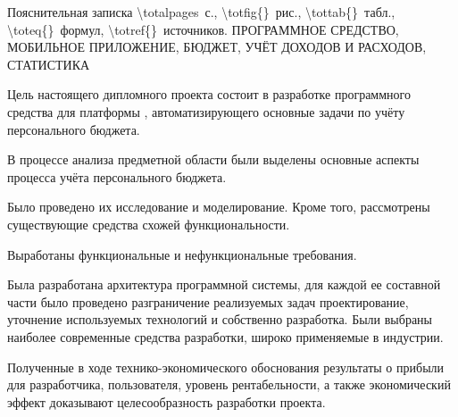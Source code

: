 \thispagestyle{empty}


\begin{center}
	Пояснительная записка \num{\totalpages}~с., 
	\num{\totfig{}}~рис., 
	\num{\tottab{}}~табл., 
	\num{\toteq{}}~формул, 
	\num{\totref{}}~источников.
	\MakeUppercase{Программное средство, мобильное приложение, бюджет, учёт доходов и расходов, статистика}
\end{center}

Цель настоящего дипломного проекта состоит в  разработке программного средства для платформы \andro, автоматизирующего основные задачи по учёту персонального бюджета.

В процессе анализа предметной области были выделены основные аспекты процесса учёта персонального бюджета.

Было проведено их исследование и моделирование.
Кроме того, рассмотрены существующие средства схожей функциональности.

Выработаны функциональные и нефункциональные требования.

Была разработана архитектура программной системы, для каждой ее составной части было проведено разграничение реализуемых задач проектирование, уточнение используемых технологий и собственно разработка.
Были выбраны наиболее современные средства разработки, широко применяемые в индустрии.

Полученные в ходе технико-экономического обоснования результаты о прибыли для разработчика, пользователя, уровень рентабельности, а также экономический эффект доказывают целесообразность разработки про\-екта.
